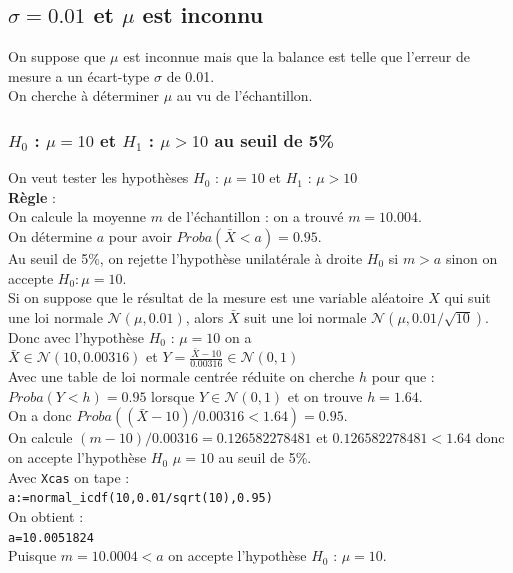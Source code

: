 \documentclass[a4paper,11pt]{book}
\begin{document}
\subsection{ $\sigma=0.01$ et $\mu$ est inconnu}
On suppose que $\mu$ est inconnue mais que la balance est telle que 
l'erreur de mesure a un \'ecart-type  $\sigma$ de 0.01.\\
On cherche \`a d\'eterminer $\mu$ au vu de l'\'echantillon.
\subsubsection{$H_0$ : $\mu=10$ et $H_1$ :  $\mu>10$ au  seuil de 5\%}
On veut tester les hypoth\`eses $H_0$ : $\mu=10$ et $H_1$ :  $\mu>10$\\
{\bf R\`egle} :\\
On calcule la moyenne $m$ de l'\'echantillon : on a trouv\'e $m=10.004$.\\
On d\'etermine $a$ pour avoir $Proba(\bar X<a)=0.95$.\\
Au seuil de 5\%, on rejette l'hypoth\`ese unilat\'erale \`a 
droite $H_0$ si $m>a$ sinon on accepte $H_0 : \mu=10$.\\
Si on suppose que le r\'esultat de la mesure est une variable al\'eatoire $X$
qui suit une loi normale $\mathcal N(\mu,0.01)$, alors $\bar X$ suit une
loi normale $\mathcal N(\mu,0.01/\sqrt{10})$.\\ 
Donc avec l'hypoth\`ese $H_0$ : $\mu=10$ on a \\
$\bar X \in \mathcal N(10,0.00316)$ et 
$Y=\frac{\bar X-10}{0.00316} \in \mathcal N(0,1)$\\
Avec une table de loi normale centr\'ee r\'eduite on cherche $h$ pour que :\\
$Proba(Y<h)=0.95$ lorsque $Y\in \mathcal N(0,1)$ et on trouve $h=1.64$.\\
On a donc $Proba((\bar X-10)/0.00316<1.64)=0.95$.\\
On calcule $(m-10)/0.00316=0.126582278481$ et $0.126582278481<1.64$ donc on 
accepte l'hypoth\`ese $H_0$ $\mu=10$ au seuil de 5\%.\\
Avec {\tt Xcas} on tape :\\
{\tt a:=normal\_icdf(10,0.01/sqrt(10),0.95)}\\
On obtient :\\
{\tt a=10.0051824}\\
Puisque $m=10.0004<a$ on accepte l'hypoth\`ese $H_0$ : $\mu=10$.
\end{document}
